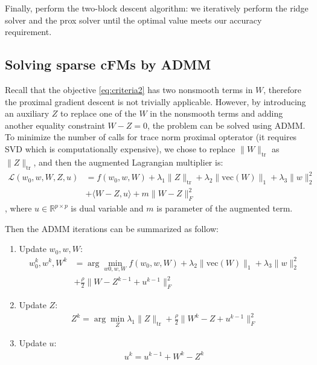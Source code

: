 \documentclass{article}
\newcommand{\tr}{\text{tr}}
\newcommand{\vecc}{\text{vec}}
\begin{document}
Finally, perform the two-block descent algorithm: we iteratively perform the ridge solver and the prox solver until the optimal value meets our accuracy requirement.


\subsection{Solving sparse cFMs by ADMM} \label{sec:admm}

Recall that the objective \cref{eq:criteria2} has two nonsmooth terms in $W$, therefore the proximal gradient descent is not trivially applicable. However, by introducing an auxiliary $Z$ to replace one of the $W$ in the nonsmooth terms and adding another equality constraint $W - Z = 0$, the problem can be solved using ADMM. To minimize the number of calls for trace norm proximal opterator (it requires SVD which is computationally expensive), we chose to replace $\|W\|_{\tr}$ as $\|Z\|_{\tr}$, and then the augmented Lagrangian multiplier is:
\begin{align}
  \mathcal{L}(w_0, w, W, Z, u) &= f(w_0, w, W) + \lambda_1 \|Z\|_{\tr} + \lambda_2 \|\vecc(W)\|_1 + \lambda_3 \|w\|_2^2 \nonumber\\
  &+ \langle W - Z, u \rangle + m\|W - Z\|_F^2 \nonumber
\end{align}
, where $u \in \mathbb{R}^{p \times p}$ is dual variable and $m$ is parameter of the augmented term. 

Then the ADMM iterations can be summarized as follow:
\begin{enumerate}
    \item Update $w_0, w, W$:
    \begin{align*}
        w_0^k, w^k, W^k &= \arg\min_{w0, w, W} f(w_0, w, W) + \lambda_2 \|\vecc(W)\|_1 + \lambda_3 \|w\|_2^2 \\
        &+ \frac{\rho}{2} \|W - Z^{k - 1} + u^{k - 1}\|_F^2
    \end{align*}
    \item Update $Z$:
    \begin{align*}
        Z^k = \arg\min_Z \lambda_1 \|Z\|_{\tr} + \frac{\rho}{2}\|W^k - Z + u^{k-1}\|_F^2
    \end{align*}
    \item Update $u$:
    \begin{align*}
        u^k = u^{k - 1} + W^k - Z^k
    \end{align*}
\end{enumerate}
\end{document}
